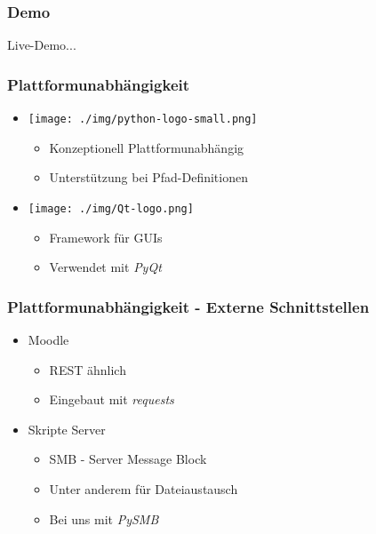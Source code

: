\documentclass{beamer}
\begin{document}
	\begin{frame}
	\frametitle{Demo}
	Live-Demo...
	\end{frame}
	
	\begin{frame}
	\frametitle{Plattformunabhängigkeit}
	
	\begin{itemize}
	  \item[]
	    \texttt{[image: ./img/python-logo-small.png]}
	    \begin{itemize}
	      \item Konzeptionell Plattformunabhängig
	      \item Unterstützung bei Pfad-Definitionen
	    \end{itemize}
      \vspace{1em}
	  \item[]
	    \texttt{[image: ./img/Qt-logo.png]}
	    \begin{itemize}
	      \item Framework für GUIs
	      \item Verwendet mit \emph{PyQt}
	    \end{itemize}
	\end{itemize}
	\end{frame}
	
	\begin{frame}
	\frametitle{Plattformunabhängigkeit - Externe Schnittstellen}
	
	\begin{itemize}
	  \item Moodle
	    \begin{itemize}
	      \item REST ähnlich
	      \item Eingebaut mit \emph{requests}
	    \end{itemize}
	  \item Skripte Server
	    \begin{itemize}
	      \item SMB - Server Message Block
	      \item Unter anderem für Dateiaustausch
	      \item Bei uns mit \emph{PySMB}
	    \end{itemize}
	\end{itemize}
	\end{frame}
	
\end{document}
